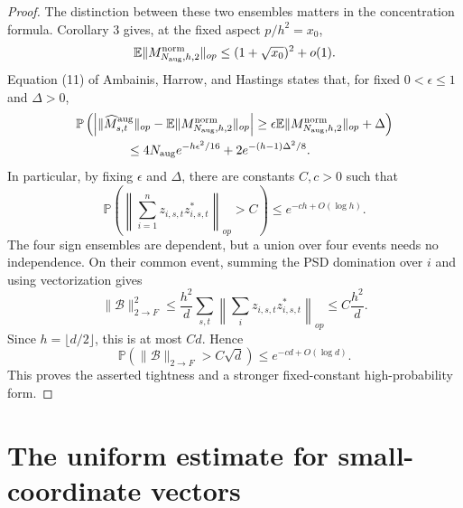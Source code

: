 \documentclass[11pt]{article}
\numberwithin{equation}{section}
\theoremstyle{definition}
\theoremstyle{remark}
\newcommand{\E}{\mathbb E}
\newcommand{\Pp}{\mathbb P}
\newcommand{\1}{\boldsymbol 1}
\begin{document}
\begin{aiblock}
\begin{proof}
  The distinction between these two ensembles matters in
  the concentration formula. Corollary 3 gives, at the
  fixed aspect $p/h^2=x_0$,
  \[
    \E\|M_{N_{\rm aug},h,2}^{\rm norm}\|_{op} \le
    (1+\sqrt{x_0})^2+o(1).
  \]
  Equation (11) of Ambainis, Harrow, and Hastings states
  that, for fixed $0<\epsilon\le1$ and $\Delta>0$,
  \[
    \begin{aligned}
      &\Pp\left(
      \left|\|\widehat M_{s,t}^{\rm aug}\|_{op}
      -\E\|M_{N_{\rm aug},h,2}^{\rm norm}\|_{op}\right|
      \ge \epsilon\E\|M_{N_{\rm aug},h,2}^{\rm norm}\|
      _{op}+\Delta \right)\\
      &\hspace{4em}\le4N_{\rm aug}
      e^{-h\epsilon^2/16}+2e^{-(h-1)\Delta^2/8}.
    \end{aligned}
  \]
  In particular, by fixing $\epsilon$ and $\Delta$,
  there are constants $C,c>0$ such that
  \[
    \Pp\left( \left\|\sum_{i=1}^n
    z_{i,s,t}z_{i,s,t}^*\right\|_{op}>C \right) \le
    e^{-ch+O(\log h)}.
  \]
  The four sign ensembles are dependent, but a union over
  four events needs no independence. On their common
  event, summing the PSD domination over $i$ and using
  vectorization gives
  \[
    \|\mathcal{B}\|_{2\mathbin{\to}F}^2 \le\frac{h^2}{d}
    \sum_{s,t} \left\|\sum_i
    z_{i,s,t}z_{i,s,t}^*\right\|_{op} \le
    C\frac{h^2}{d}.
  \]
  Since $h=\lfloor d/2\rfloor$, this is at most $Cd$.
  Hence
  \[
    \Pp\left(\|\mathcal{B}\|_{2\mathbin{\to}F}>C\sqrt d
    \right) \le e^{-cd+O(\log d)}.
  \]
  This proves the asserted tightness and a stronger
  fixed-constant high-probability form.
\end{proof}
   
\end{aiblock}


 
\section{The uniform estimate for
  small-coordinate
  vectors}\label{the-localized-conditional-tube-theorem}
\end{document}
